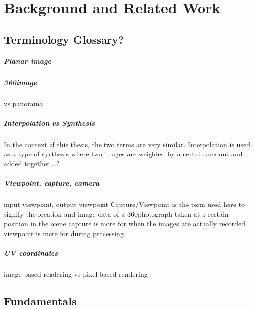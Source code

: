 \chapter{Background and Related Work}

\section{Terminology \ar Glossary?}

\paragraph{Planar image}
\paragraph{360\degree image} vs panorama
\paragraph{Interpolation vs Synthesis} In the context of this thesis, the two terms are very similar. Interpolation is used as a type of synthesis where two images are weighted by a certain amount and added together \ldots ?
\paragraph{Viewpoint, capture, camera} input viewpoint, output viewpoint
Capture/Viewpoint is the term used here to signify the location and image data of a 360\degree photograph taken at a certain position in the scene
capture is more for when the images are actually recorded
viewpoint is more for during processing
\paragraph{UV coordinates}
image-based rendering vs pixel-based rendering

\section{Fundamentals}

